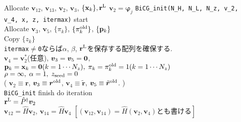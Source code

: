 \documentclass[12pt,titlepage]{jarticle}
\renewenvironment{leftbar}{%
  \def\FrameCommand{\vrule width 1pt \hspace{0pt}}%
  \MakeFramed {\advance\hsize-\width \FrameRestore}}%
 {\endMakeFramed}
\begin{document}
\noindent
Allocate ${\boldsymbol v}_{1 2}$, ${\boldsymbol v}_{1 3}$, 
${\boldsymbol v}_2$, ${\boldsymbol v}_3$, $\{{\bf x}_k\}, {\bf r}^{\rm L}$
${\boldsymbol v}_2 = {\boldsymbol \varphi_j}$
\vspace{-1em}
\begin{leftbar}
  \noindent
  \verb|BiCG_init(N_H, N_L, N_z, v_2, v_4, x, z, itermax)| start
  \\ \hspace{0.5cm}
  Allocate ${\boldsymbol v}_3$, ${\boldsymbol v}_5$, $\{\pi_k\}$, $\{\pi_k^{\rm old}\}$, $\{{\bf p}_k\}$
  \\ \hspace{0.5cm}
  Copy $\{z_k\}$
  \\ \hspace{0.5cm}
  \verb|itermax|$\neq$\verb|0|ならば$\alpha$, $\beta$, ${\bf r}^{\rm L}$を保存する配列を確保する.
  \\ \hspace{0.5cm}
  ${\boldsymbol v}_4 = {\boldsymbol v}_2^*$(任意),
  ${\boldsymbol v}_3 = {\boldsymbol v}_5 = {\bf 0}$,
  \\ \hspace{0.5cm}
  ${\bf p}_{k} = {\bf x}_k = {\bf 0}(k=1 \cdots N_z),\; \pi_k=\pi_k^{\rm old} = 1(k=1 \cdots N_z)$ 
  \\ \hspace{0.5cm}
  $\rho = \infty,\; \alpha = 1,\; z_{\rm seed}=0$ 
  \\ \hspace{0.5cm}
  (
  ${\boldsymbol v}_2 \equiv {\boldsymbol r}$, 
  ${\boldsymbol v}_3 \equiv {\boldsymbol r}^{\rm old}$,
  ${\boldsymbol v}_4 \equiv {\tilde {\boldsymbol r}}$, 
  ${\boldsymbol v}_5 \equiv {\tilde {\boldsymbol r}}^{\rm old}$. )
  \\
  \verb|BiCG_init| finish
\end{leftbar}
\vspace{-1em}
\noindent
do iteration
\\\hspace{0.5cm}
${\bf r}^{\rm L} = {\hat P}^\dagger {\boldsymbol v}_2$
\\\hspace{0.5cm}
${\boldsymbol v}_{1 2} = {\hat H} {\boldsymbol v}_2$, 
${\boldsymbol v}_{1 4} = {\hat H} {\boldsymbol v}_4$  
$ [ ({\boldsymbol v}_{1 2}, {\boldsymbol v}_{1 4}) = {\hat H}
  ({\boldsymbol v}_2, {\boldsymbol v}_4)とも書ける]$
\vspace{-1em}
\end{document}
